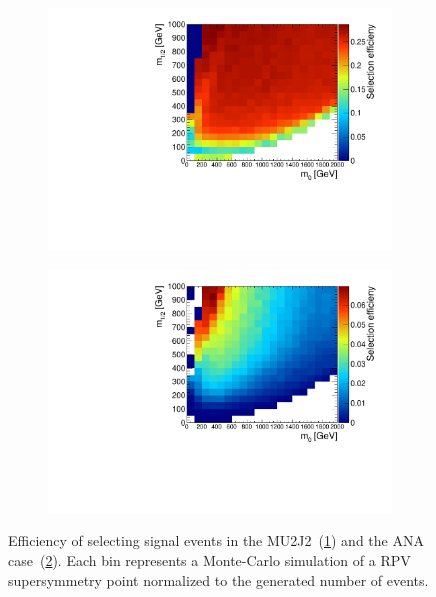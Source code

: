 \begin{figure}[ht!]
  \centering
  \begin{subfigure}[b]{0.495\textwidth}
    \centering
    \includegraphics[width=\textwidth]{plots/hSignalRatio.pdf}
    \caption{\label{fig:sig}}
  \end{subfigure}
  \begin{subfigure}[b]{0.495\textwidth}
    \centering
    \includegraphics[width=\textwidth]{plots/hCutSignalRatio.pdf}
    \caption{\label{fig:cutsig}}
  \end{subfigure}
  \caption{Efficiency of selecting signal events in the MU2J2~(\ref{fig:sig}) and the ANA case~(\ref{fig:cutsig}). Each bin represents a Monte-Carlo simulation of a RPV supersymmetry point normalized to the generated number of events.}
  \label{fig:sigeff}
\end{figure}

